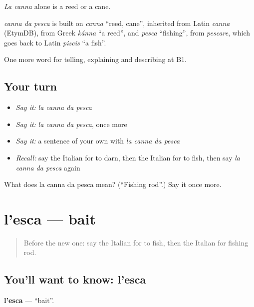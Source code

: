 \emph{La canna} alone is a reed or a cane.

\begin{cousinweb}
\emph{canna da pesca} is built on \emph{canna} \textquotedblleft{}reed, cane\textquotedblright{}, inherited from Latin \emph{canna} (EtymDB), from Greek \emph{kánna} \textquotedblleft{}a reed\textquotedblright{}, and \emph{pesca} \textquotedblleft{}fishing\textquotedblright{}, from \emph{pescare}, which goes back to Latin \emph{piscis} \textquotedblleft{}a fish\textquotedblright{}.
\end{cousinweb}

\begin{grammarlens}[title={What you've built}]
One more word for telling, explaining and describing at B1.
\end{grammarlens}

\subsection*{Your turn}
\begin{itemize}
\raggedright
  \item \emph{Say it:} \emph{la canna da pesca}
  \item \emph{Say it:} \emph{la canna da pesca}, once more
  \item \emph{Say it:} a sentence of your own with \emph{la canna da pesca}
  \item \emph{Recall:} say the Italian for to darn, then the Italian for to fish, then say \emph{la canna da pesca} again
\end{itemize}

\begin{tcolorbox}[breakable,colback=teal!4,colframe=teal!35!black,title={Before you move on}]
What does la canna da pesca mean? (\textquotedblleft{}Fishing rod\textquotedblright{}.) Say it once more.
\end{tcolorbox}
\section[l'esca]{l'esca — bait}

\label{lesson:IT-C501-esca}



\begin{quote}
Before the new one: say the Italian for to fish, then the Italian for fishing rod.
\end{quote}

\subsection*{You'll want to know: l'esca}
\textbf{l'esca} — \textquotedblleft{}bait\textquotedblright{}.

